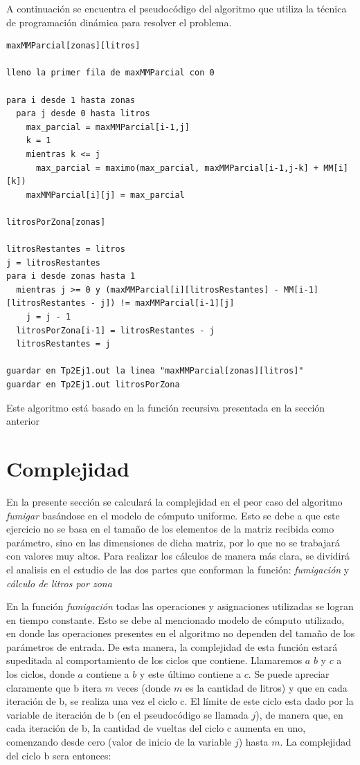\documentclass[a4paper,10pt] {article}
\begin{document}
A continuaci\'on se encuentra el pseudoc\'odigo del algoritmo que utiliza la técnica de programación dinámica para resolver el problema.

\begin{verbatim}
maxMMParcial[zonas][litros]

lleno la primer fila de maxMMParcial con 0

para i desde 1 hasta zonas
  para j desde 0 hasta litros
    max_parcial = maxMMParcial[i-1,j]
    k = 1
    mientras k <= j
      max_parcial = maximo(max_parcial, maxMMParcial[i-1,j-k] + MM[i][k])
    maxMMParcial[i][j] = max_parcial

litrosPorZona[zonas]

litrosRestantes = litros
j = litrosRestantes
para i desde zonas hasta 1
  mientras j >= 0 y (maxMMParcial[i][litrosRestantes] - MM[i-1][litrosRestantes - j]) != maxMMParcial[i-1][j]
    j = j - 1
  litrosPorZona[i-1] = litrosRestantes - j
  litrosRestantes = j

guardar en Tp2Ej1.out la linea "maxMMParcial[zonas][litros]"
guardar en Tp2Ej1.out litrosPorZona

\end{verbatim}

Este algoritmo está basado en la función recursiva presentada en la sección anterior

\section*{Complejidad}

En la presente secci\'on se calcular\'a la complejidad en el peor caso del algoritmo \textit{fumigar} bas\'andose en el modelo de c\'omputo uniforme. Esto se debe a que este ejercicio no se basa en el tama\~{n}o de los elementos de la matriz recibida como par\'ametro, sino en las dimensiones de dicha matriz, por lo que no se trabajar\'a con valores muy altos. Para realizar los c\'alculos de manera m\'as clara, se dividir\'a el analisis en el estudio de las dos partes que conforman la funci\'on: \textit{fumigaci\'on} y \textit{c\'alculo de litros por zona}

En la funci\'on \textit{fumigaci\'on} todas las operaciones y asignaciones utilizadas se logran en tiempo constante. Esto se debe al mencionado modelo de c\'omputo utilizado, en donde las operaciones presentes en el algoritmo no dependen del tama\~{n}o de los par\'ametros de entrada. De esta manera, la complejidad de esta funci\'on estar\'a supeditada al comportamiento de los ciclos que contiene. Llamaremos $a$ $b$ y $c$ a los ciclos, donde $a$ contiene a $b$ y este \'ultimo contiene a $c$. Se puede apreciar claramente que b itera $m$ veces (donde $m$ es la cantidad de litros) y que en cada iteraci\'on de b, se realiza una vez el ciclo c. El l\'imite de este ciclo esta dado por la variable de iteraci\'on de b (en el pseudoc\'odigo se llamada $j$), de manera que, en cada iteraci\'on de b, la cantidad de vueltas del ciclo c aumenta en uno, comenzando desde cero (valor de inicio de la variable $j$) hasta $m$. La complejidad del ciclo b sera entonces:
\end{document}
